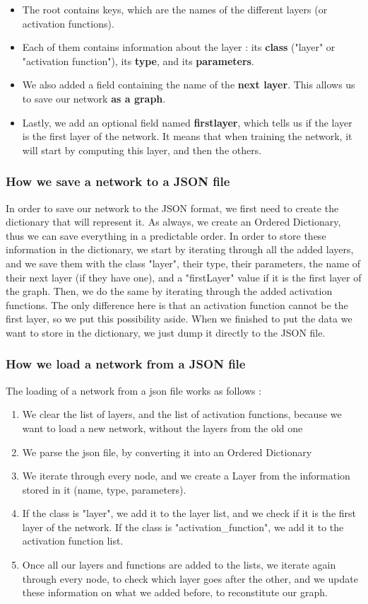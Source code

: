 \begin{itemize}
    \item The root contains keys, which are the names of the different layers (or activation functions).
    \item Each of them contains information about the layer : its \textbf{class} ("layer" or "activation function"), its \textbf{type}, and its \textbf{parameters}.
    \item We also added a field containing the name of the \textbf{next layer}. This allows us to save our network \textbf{as a graph}.
    \item Lastly, we add an optional field named \textbf{firstlayer}, which tells us if the layer is the first layer of the network. It means that when training the network, it will start by computing this layer, and then the others.
\end{itemize}
\subsubsection{How we save a network to a JSON file}
In order to save our network to the JSON format, we first need to create the dictionary that will represent it. As always, we create an Ordered Dictionary, thus we can save everything in a predictable order.
\newline In order to store these information in the dictionary, we start by iterating through all the added layers, and we save them with the class "layer", their type, their parameters, the name of their next layer (if they have one), and a "firstLayer" value if it is the first layer of the graph. Then, we do the same by iterating through the added activation functions. The only difference here is that an activation function cannot be the first layer, so we put this possibility aside.
\newline When we finished to put the data we want to store in the dictionary, we just dump it directly to the JSON file.
\subsubsection{How we load a network from a JSON file}
The loading of a network from a json file works as follows :
\begin{enumerate}
    \item We clear the list of layers, and the list of activation functions, because we want to load a new network, without the layers from the old one
    \item We parse the json file, by converting it into an Ordered Dictionary
    \item We iterate through every node, and we create a Layer from the information stored in it (name, type, parameters).
    \item If the class is "layer", we add it to the layer list, and we check if it is the first layer of the network. If the class is "activation\_function", we add it to the activation function list.
    \item Once all our layers and functions are added to the lists, we iterate again through every node, to check which layer goes after the other, and we update these information on what we added before, to reconstitute our graph.
\end{enumerate}

